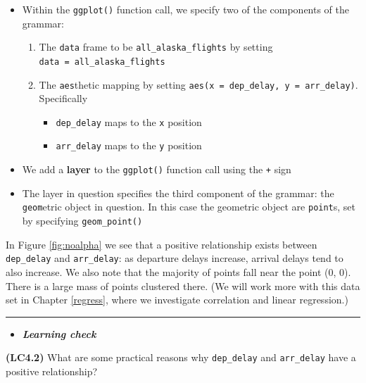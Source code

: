 \documentclass[]{tufte-book}
\let\oldrule=\rule
\renewcommand{\rule}[1]{\oldrule{\linewidth}}
\providecommand{\tightlist}{%
  \setlength{\itemsep}{0pt}\setlength{\parskip}{0pt}}
\newenvironment{rmdblock}[1]
  {\begin{shaded*}
  \begin{itemize}
  \renewcommand{\labelitemi}{
    \raisebox{-.7\height}[0pt][0pt]{
    }
  }
  \item
  }
  {
  \end{itemize}
  \end{shaded*}
  }
\newenvironment{learncheck}
  {\begin{rmdblock}{warning}}
  {\end{rmdblock}}
\begin{document}
\begin{itemize}
\tightlist
\item
  Within the \texttt{ggplot()} function call, we specify two of the
  components of the grammar:

  \begin{enumerate}
  \def\labelenumi{\arabic{enumi}.}
  \tightlist
  \item
    The \texttt{data} frame to be \texttt{all\_alaska\_flights} by
    setting \texttt{data\ =\ all\_alaska\_flights}
  \item
    The \texttt{aes}thetic mapping by setting
    \texttt{aes(x\ =\ dep\_delay,\ y\ =\ arr\_delay)}. Specifically

    \begin{itemize}
    \tightlist
    \item
      \texttt{dep\_delay} maps to the \texttt{x} position
    \item
      \texttt{arr\_delay} maps to the \texttt{y} position
    \end{itemize}
  \end{enumerate}
\item
  We add a \textbf{layer} to the \texttt{ggplot()} function call using
  the \texttt{+} sign
\item
  The layer in question specifies the third component of the grammar:
  the \texttt{geom}etric object in question. In this case the geometric
  object are \texttt{point}s, set by specifying \texttt{geom\_point()}
\end{itemize}

In Figure \ref{fig:noalpha} we see that a positive relationship exists
between \texttt{dep\_delay} and \texttt{arr\_delay}: as departure delays
increase, arrival delays tend to also increase. We also note that the
majority of points fall near the point (0, 0). There is a large mass of
points clustered there. (We will work more with this data set in Chapter
\ref{regress}, where we investigate correlation and linear regression.)

\begin{center}\rule{0.5\linewidth}{\linethickness}\end{center}

\begin{learncheck}
\textbf{\emph{Learning check}}
\end{learncheck}

\textbf{(LC4.2)} What are some practical reasons why \texttt{dep\_delay}
and \texttt{arr\_delay} have a positive relationship?
\end{document}
